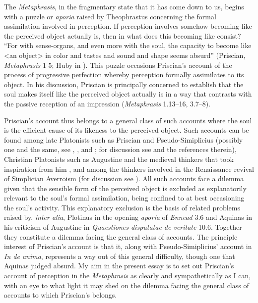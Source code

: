 \documentclass[12pt]{article}
\begin{document}
The \emph{Metaphrasis}, in the fragmentary state that it has come down to us, begins with a puzzle or \emph{aporia} raised by Theophrastus concerning the formal assimilation involved in perception. If perception involves somehow becoming like the perceived object actually is, then in what does this becoming like consist? ``For with sense-organs, and even more with the soul, the capacity to become like <an object> in color and tastes and sound and shape seems absurd'' (Priscian, \emph{Metaphrasis} 1 5; Huby in \citealt{Sorabji:1997ly}). This puzzle occasions Priscian's account of the process of progressive perfection whereby perception formally assimilates to its object. In his discussion, Priscian is principally concerned to establish that the soul makes itself like the perceived object actually is in a way that contrasts with the passive reception of an impression (\emph{Metaphrasis} 1.13--16, 3.7--8).

Priscian's account thus belongs to a general class of such accounts where the soul is the efficient cause of its likeness to the perceived object. Such accounts can be found among late Platonists such as Priscian and Pseudo-Simiplicius (possibly one and the same, see \citealt{Bossier:1972rp}, \citealt{Steel:1978th}, and \citealt[103--140]{Sorabji:1997ly}; for discussion see \citealt[18-24]{Finamore:2002yf} and the references therein), Christian Platonists such as Augustine and the medieval thinkers that took inspiration from him \citep{Silva:2014bh,Toivanen:2013ul}, and among the thinkers involved in the Renaissance revival of Simplician Averroism (for discussion see \citealt[chapter 8]{Spruit:1995fh}). All such accounts face a dilemma given that the sensible form of the perceived object is excluded as explanatorily relevant to the soul's formal assimilation, being confined to at best occasioning the soul's activity. This explanatory exclusion is the basis of related problems raised by, \emph{inter alia}, Plotinus in the opening \emph{aporia} of \emph{Ennead} 3.6 and Aquinas in his criticism of Augustine in \emph{Quaestiones disputatae de veritate} 10.6. Together they constitute a dilemma facing the general class of accounts. The principle interest of Priscian's account is that it, along with Pseudo-Simiplicius' account in \emph{In de anima}, represents a way out of this general difficulty, though one that Aquinas judged absurd. My aim in the present essay is to set out Priscian's account of perception in the \emph{Metaphrasis} as clearly and sympathetically as I can, with an eye to what light it may shed on the dilemma facing the general class of accounts to which Priscian's belongs.
\end{document}

